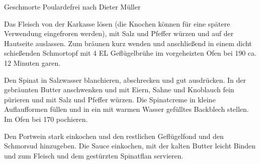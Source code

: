 \begin{recipe}{Geschmorte Poularde}{frei nach Dieter Müller}
  \label{Geschmorte Poulardenbrust}


  \steps
  Das Fleisch von der Karkasse lösen (die Knochen können für eine spätere
  Verwendung eingefroren werden), mit Salz und Pfeffer würzen und auf der
  Hautseite auslassen. Zum bräunen kurz wenden und anschließend in einem dicht
  schießenden Schmortopf mit 4 EL Geflügelbrühe im vorgeheizten Ofen bei 190
  \celsius ca. 12 Minuten garen.

  Den Spinat in Salzwasser blanchieren, abschrecken und gut ausdrücken. In der
  gebräunten Butter anschwenken und mit Eiern, Sahne und Knoblauch fein
  pürieren und mit Salz und Pfeffer würzen. Die Spinatcreme in kleine
  Auflaufformen füllen und in ein mit warmen Wasser gefülltes Backblech
  stellen. Im Ofen bei 170 \celsius pochieren.

  Den Portwein stark einkochen und den restlichen Geflügelfond und den
  Schmorsud hinzugeben. Die Sauce einkochen, mit der kalten Butter leicht
  Binden und zum Fleisch und dem gestürzten Spinatflan servieren.
\end{recipe}
